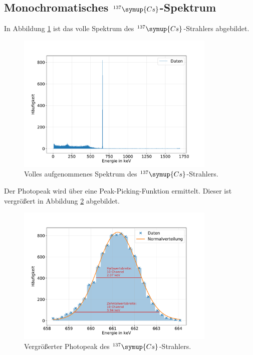 
\subsection{Monochromatisches $^{137}\symup{Cs}$-Spektrum}
In Abbildung \ref{fig:cs_spectrum} ist das volle Spektrum des $^{137}\symup{Cs}$-Strahlers abgebildet.
\begin{figure}[h!]
  \centering
  \includegraphics[width=0.85\textwidth]{content/images/caesium_vollesspektrum.pdf}
  \caption{Volles aufgenommenes Spektrum des $^{137}\symup{Cs}$-Strahlers.}
  \label{fig:cs_spectrum}
\end{figure}
Der Photopeak wird über eine Peak-Picking-Funktion ermittelt.
Dieser ist vergrößert in Abbildung \ref{fig:cs_photopeak} abgebildet.
\begin{figure}[h!]
  \centering
  \includegraphics[width=0.85\textwidth]{content/images/caesium_peak_1.pdf}
  \caption{Vergrößerter Photopeak des $^{137}\symup{Cs}$-Strahlers.}
  \label{fig:cs_photopeak}
\end{figure}
